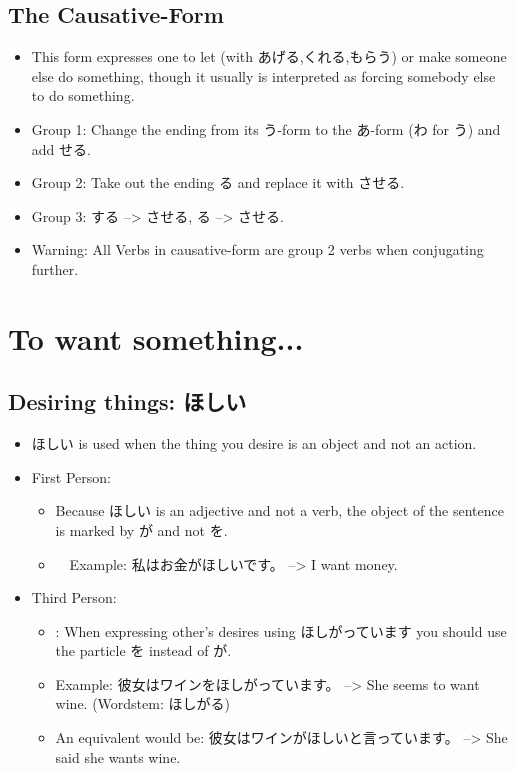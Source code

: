 \documentclass{article}
\newcommand\tabyon[1][0.4cm]{\hspace*{#1}}
\begin{document}
\subsection{The Causative-Form }	
\begin{itemize}
\item This form expresses one to let (with あげる,くれる,もらう) or make someone else do something, though it usually is interpreted as forcing somebody else to do something.
\item Group 1: Change the ending from its う-form to the あ-form (わ for う) and add せる.
\item Group 2: Take out the ending る and replace it with させる.
\item Group 3: する --> させる, \tabyon {}る --> させる.
\item Warning: All Verbs in causative-form are group 2 verbs when conjugating further.
\end{itemize}
\section{To want something...}
\subsection{Desiring things: ほしい}
\begin{itemize}
\item ほしい is used when the thing you desire is an object and not an action.
\item First Person:
\begin{itemize}
\item Because ほしい is an adjective and not a verb, the object of the sentence is marked by が and not を.
\item　Example: 私はお金がほしいです。 --> I want money.
\end{itemize}
\item Third Person:
\begin{itemize}
\item: When expressing other’s desires using ほしがっています you should use the particle を instead of が.
\item Example: 彼女はワインをほしがっています。	 --> She seems to want wine.	(Wordstem: ほしがる)
\item An equivalent would be: 彼女はワインがほしいと言っています。 --> She said she wants wine.
\end{itemize}
\end{itemize}
\end{document}
